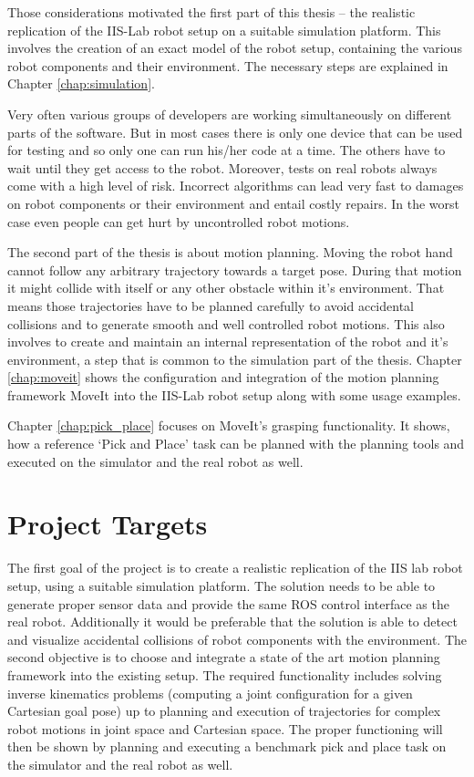 Those considerations motivated the first part of this thesis -- the realistic replication of the IIS-Lab robot setup on a suitable simulation platform. This involves the creation of an exact model of the robot setup, containing the various robot components and their environment. The necessary steps are explained in Chapter \ref{chap:simulation}.


Very often various groups of developers are working simultaneously on different parts of the software. But in most cases there is only one device that can be used for testing and so only one can run his/her code at a time. The others have to wait until they get access to the robot. Moreover, tests on real robots always come with a high level of risk. Incorrect algorithms can lead very fast to damages on robot components or their environment and entail costly repairs. In the worst case even people can get hurt by uncontrolled robot motions.

The second part of the thesis is about motion planning. Moving the robot hand cannot follow any arbitrary trajectory towards a target pose. During that motion it might collide with itself or any other obstacle within it's environment. That means those trajectories have to be planned carefully to avoid accidental collisions and to generate smooth and well controlled robot motions. This also involves to create and maintain an internal representation of the robot and it's environment, a step that is common to the simulation part of the thesis. Chapter \ref{chap:moveit} shows the configuration and integration of the motion planning framework MoveIt into the IIS-Lab robot setup along with some usage examples.

Chapter \ref{chap:pick_place} focuses on MoveIt's grasping functionality. It shows, how a reference `Pick and Place' task can be planned with the planning tools  and executed on the simulator and the real robot as well.

\section{Project Targets}

The first goal of the project is to create a realistic replication of the IIS lab robot setup, using a suitable simulation platform. The solution needs to be able to generate proper sensor data and provide the same ROS control interface as the real robot. Additionally it would be preferable that the solution is able to detect and visualize accidental collisions of robot components with the environment. The second objective is to choose and integrate a state of the art motion planning framework into the existing setup. The required functionality includes  solving inverse kinematics problems (computing a joint configuration for a given Cartesian goal pose) up to planning and execution of trajectories for complex robot motions in joint space and Cartesian space. The proper functioning will then be shown by planning and executing a benchmark pick and place task on the simulator and the real robot as well.

